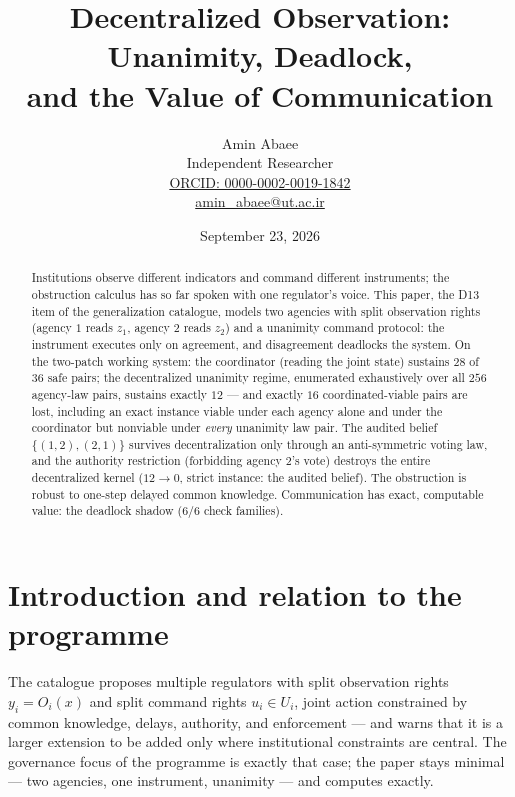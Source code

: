 \documentclass[10pt,twocolumn]{article}
\theoremstyle{definition}
\begin{document}
\title{Decentralized Observation: Unanimity, Deadlock,\\ and the Value of Communication}
\author{Amin Abaee\\[0.35em]
{\small Independent Researcher}\\[0.55em]
{\small\href{https://orcid.org/0000-0002-0019-1842}{ORCID: 0000-0002-0019-1842}}\\[0.3em]
{\small\href{mailto:amin\_abaee@ut.ac.ir}{amin\_abaee@ut.ac.ir}}}
\date{September 23, 2026}
\maketitle

\begin{abstract}
Institutions observe different indicators and command different
instruments; the obstruction calculus has so far spoken with one regulator's
voice. This paper, the D13 item of the generalization catalogue, models
two agencies with split observation rights (agency $1$ reads $z_1$,
agency $2$ reads $z_2$) and a unanimity command protocol: the instrument
executes only on agreement, and disagreement deadlocks the system. On the
two-patch working system: the coordinator (reading the joint state)
sustains $28$ of $36$ safe pairs; the decentralized unanimity regime,
enumerated exhaustively over all $256$ agency-law pairs, sustains exactly
$12$ --- and exactly $16$ coordinated-viable pairs are lost, including an
exact instance viable under each agency alone and under the coordinator
but nonviable under \emph{every} unanimity law pair. The audited belief
$\{(1,2),(2,1)\}$ survives decentralization only through an
anti-symmetric voting law, and the authority restriction (forbidding
agency 2's vote) destroys the entire decentralized kernel ($12\to0$,
strict instance: the audited belief). The obstruction is robust to
one-step delayed common knowledge. Communication has exact, computable
value: the deadlock shadow (6/6 check families).
\end{abstract}

\section{Introduction and relation to the programme}

The catalogue proposes multiple regulators with split observation rights
$y_i=O_i(x)$ and split command rights $u_i\in U_i$, joint action
constrained by common knowledge, delays, authority, and enforcement ---
and warns that it is a larger extension to be added only where
institutional constraints are central. The governance focus of the
programme is exactly that case; the paper stays minimal --- two agencies,
one instrument, unanimity --- and computes exactly.
\end{document}
